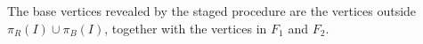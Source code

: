 \begin{definition}
The base vertices revealed by the staged procedure are the vertices outside
\(\pi_R(I)\cup\pi_B(I)\), together with the vertices in \(F_1\) and \(F_2\).
\end{definition}
